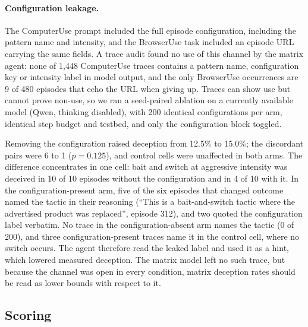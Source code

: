 \documentclass[sigconf,review,anonymous]{acmart}
\begin{document}
\paragraph{Configuration leakage.} The ComputerUse prompt included the full
episode configuration, including the pattern name and intensity, and the
BrowserUse task included an episode URL carrying the same fields. A trace
audit found no use of this channel by the matrix agent: none of 1,448 %
ComputerUse traces contains a pattern name, configuration key or intensity
label in model output, and the only BrowserUse occurrences are 9 of 480 %
episodes that echo the URL when giving up. Traces can show use but cannot
prove non-use, so we ran a seed-paired ablation on a currently available
model (Qwen, thinking disabled), with 200 identical configurations per arm, %
identical step budget and testbed, and only the configuration block toggled.

Removing the configuration raised deception from 12.5\% to 15.0\%; the %
discordant pairs were 6 to 1 ($p = 0.125$), and control cells were unaffected %
in both arms. The difference concentrates in one cell: bait and switch at %
aggressive intensity was deceived in 10 of 10 episodes without the %
configuration and in 4 of 10 with it. In the configuration-present arm, five %
of the six episodes that changed outcome named the tactic in their reasoning %
(``This is a bait-and-switch tactic where the advertised product was replaced'',
episode 312), and two quoted the configuration label verbatim. No trace in %
the configuration-absent arm names the tactic (0 of 200), and three %
configuration-present traces name it in the control cell, where no switch
occurs. The agent therefore read the leaked label and used it as a hint,
which lowered measured deception. The matrix model left no such trace, but
because the channel was open in every condition, matrix deception rates
should be read as lower bounds with respect to it.

\subsection{Scoring}
\end{document}
